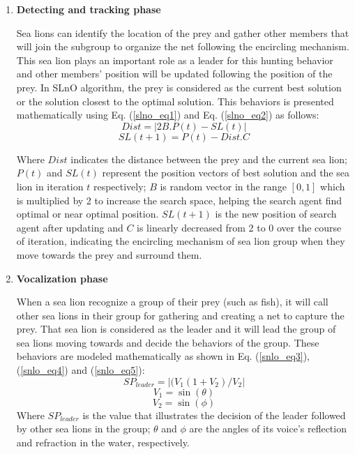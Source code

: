 \documentclass[a4paper,13pt,2p]{report}
\begin{document}
\begin{enumerate}
\item \textbf{Detecting and tracking phase}

	Sea lions can identify the location of the prey and gather other members that will join the subgroup to organize the net following the encircling mechanism. This sea lion plays an important role as a leader for this hunting behavior and other members' position will be updated following the position of the prey. In SLnO algorithm, the prey is considered as the current best solution or the solution closest to the optimal solution. This behaviors is presented mathematically using Eq. (\ref{slno_eq1}) and Eq. (\ref{slno_eq2}) as follows:
\begin{equation}\label{slno_eq1}
Dist = |2B.P(t) - SL(t)|
\end{equation}
\begin{equation}\label{slno_eq2}
SL(t+1) = P(t) - Dist.C
\end{equation}
	
	Where $Dist$ indicates the distance between the prey and the current sea lion; $P(t)$ and $SL(t)$ represent the position vectors of best solution and the sea lion in iteration $t$ respectively; $B$ is random vector in the range $[0, 1]$ which is multiplied by 2 to increase the search space, helping the search agent find optimal or near optimal position. $SL(t+1)$ is the new position of search agent after updating and $C$ is linearly decreased from 2 to 0 over the course of iteration, indicating the encircling mechanism of sea lion group when they move towards the prey and surround them.

\item \textbf{Vocalization phase}
	
	When a sea lion recognize a group of their prey (such as fish), it will call other sea lions in their group for gathering and creating a net to capture the prey. That sea lion is considered as the leader and it will lead the group of sea lions moving towards and decide the behaviors of the group. These behaviors are modeled mathematically as shown in Eq. (\ref{snlo_eq3}), (\ref{snlo_eq4}) and (\ref{snlo_eq5}):
\begin{equation}\label{snlo_eq3}
SP_{leader} = |(V_1(1+V_2)/V_2|
\end{equation}
\begin{equation}\label{snlo_eq4}
V_1 = \sin(\theta)
\end{equation}
\begin{equation}\label{snlo_eq5}
V_2 = \sin(\phi)
\end{equation}
 Where $SP_{leader}$ is the value that illustrates the decision of the leader followed by other sea lions in the group; $\theta$ and $\phi$ are the angles of its voice's reflection and refraction in the water, respectively.
 

\end{enumerate}
\end{document}
